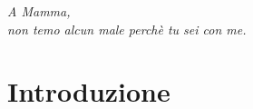 \documentclass[]{article}
\begin{document}
\tableofcontents
\break
\listoffigures
\cleardoublepage

\newpage 


\vspace*{6cm}
	\begin{flushright}
	\textit{A Mamma,\\ non temo alcun male perchè tu sei con me.}
\end{flushright}
\vspace*{\fill}




\newpage



\section*{Introduzione}
\end{document}
